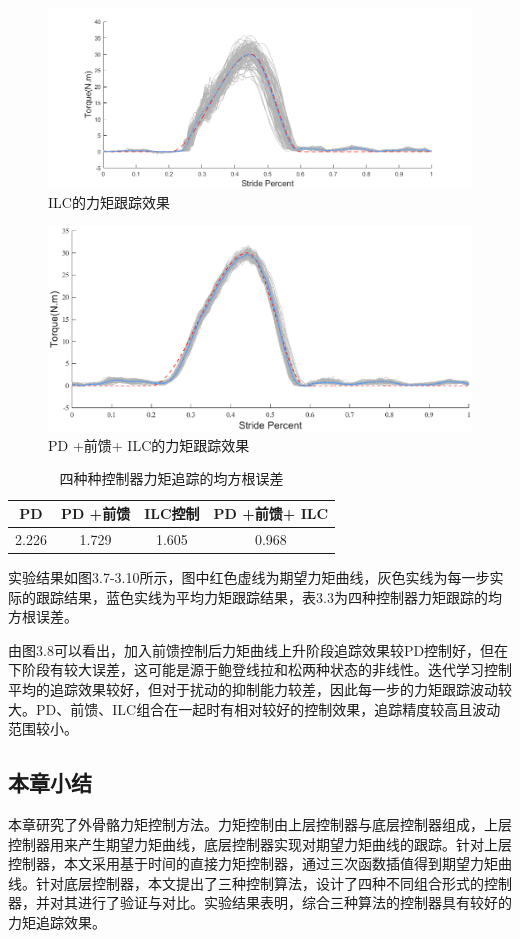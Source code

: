 \begin{figure}[!htb]
    \includegraphics[width=17cm]{fig/f58.png}
    \caption{ILC的力矩跟踪效果}
    \label{fig:mark}
\end{figure}
\begin{figure}[!htb]
    \includegraphics[width=17cm]{fig/f59.eps}
    \caption{PD +前馈+ ILC的力矩跟踪效果}
    \label{fig:mark}
\end{figure}

\begin{table}[!htb]
    \caption[控制参数]{四种种控制器力矩追踪的均方根误差}
    \begin{tabular}{cccc}
      \toprule
        PD & PD +前馈 & ILC控制 & PD +前馈+ ILC \\
      \midrule
        2.226 & 1.729 & 1.605 & 0.968 \\
      \bottomrule
    \end{tabular}
\end{table}

实验结果如图3.7-3.10所示，图中红色虚线为期望力矩曲线，灰色实线为每一步实际的跟踪结果，蓝色实线为平均力矩跟踪结果，表3.3为四种控制器力矩跟踪的均方根误差。

由图3.8可以看出，加入前馈控制后力矩曲线上升阶段追踪效果较PD控制好，但在下阶段有较大误差，这可能是源于鲍登线拉和松两种状态的非线性。迭代学习控制平均的追踪效果较好，但对于扰动的抑制能力较差，因此每一步的力矩跟踪波动较大。PD、前馈、ILC组合在一起时有相对较好的控制效果，追踪精度较高且波动范围较小。

\subsection{本章小结}

本章研究了外骨骼力矩控制方法。力矩控制由上层控制器与底层控制器组成，上层控制器用来产生期望力矩曲线，底层控制器实现对期望力矩曲线的跟踪。针对上层控制器，本文采用基于时间的直接力矩控制器，通过三次函数插值得到期望力矩曲线。针对底层控制器，本文提出了三种控制算法，设计了四种不同组合形式的控制器，并对其进行了验证与对比。实验结果表明，综合三种算法的控制器具有较好的力矩追踪效果。